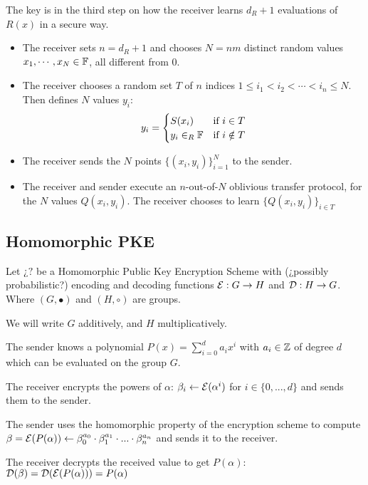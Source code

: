 The key is in the third step on how the receiver learns $d_R + 1$ evaluations of $R(x)$ in a secure way.

\begin{itemize}[align = left, leftmargin=*]
\item The receiver sets $n = d_R + 1$ and chooses $N = nm$ distinct random values $x_1, \cdots, x_N \in {\mathbb F}$, all different from $0$.

\item The receiver chooses a random set $T$ of $n$ indices $1 \leq i_1 < i_2 < \cdots < i_n \leq N$. Then defines $N$ values $y_i$:
    $$y_i = 
        \begin{cases}
            S(x_i)        & \mbox{if } i \in T \\
            y_i \in_R {\mathbb F} & \mbox{if } i \notin T
        \end{cases} $$
        
\item The receiver sends the $N$ points $\{(x_i, y_i)\}^N_{i=1}$ to the sender.

\item The receiver and sender execute an $n$-out-of-$N$ oblivious transfer protocol, for the $N$ values $Q(x_i,y_i)$. The receiver chooses to learn $\{Q(x_i,y_i)\}_{i\in T}$
\end{itemize}


\subsection{Homomorphic PKE}
Let $¿?$ be a Homomorphic Public Key Encryption Scheme with (¿possibly probabilistic?) encoding and decoding functions $\mathcal{E}: G \rightarrow H$ and $\mathcal{D}: H \rightarrow G$. Where $(G,\bullet)$ and $(H,\circ)$ are groups.

We will write $G$ additively, and $H$ multiplicatively.

The sender knows a polynomial $P(x) = \sum_{i=0}^d a_i x^i$ with $a_i \in {\mathbb Z}$ of degree $d$ which can be evaluated on the group $G$. 

The receiver encrypts the powers of $\alpha$: $\beta_i \leftarrow \mathcal{E}(\alpha^i)$ for $i \in \{0, ..., d\}$ and sends them to the sender.

The sender uses the homomorphic property of the encryption scheme to compute $\beta = \mathcal{E}(P(\alpha)) \leftarrow \beta_0^{a_0} \cdot \beta_1^{a_1} \cdot ... \cdot \beta_n^{a_n}$ and sends it to the receiver.

The receiver decrypts the received value to get $P(\alpha)$:
$\mathcal{D}(\beta) = \mathcal{D}(\mathcal{E}(P(\alpha))) = P(\alpha) $




